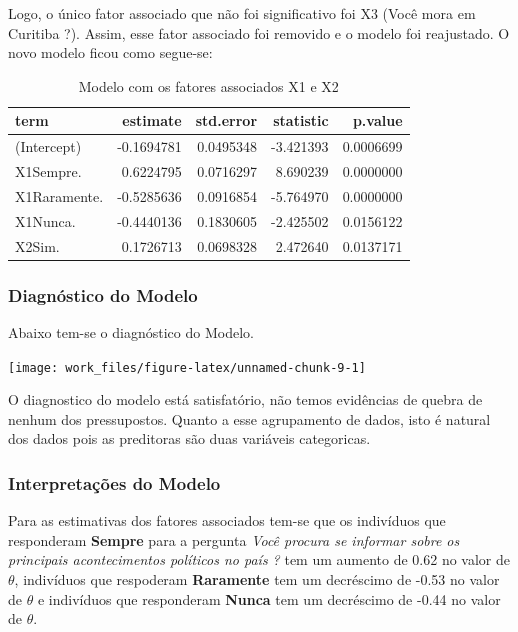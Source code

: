 \documentclass[]{article}
\begin{document}
Logo, o único fator associado que não foi significativo foi X3 (Você
mora em Curitiba ?). Assim, esse fator associado foi removido e o modelo
foi reajustado. O novo modelo ficou como segue-se:

\begin{table}[!h]

\caption{\label{tab:unnamed-chunk-8}Modelo com os fatores associados X1 e X2}
\centering
\begin{tabular}[t]{lrrrr}
\toprule
term & estimate & std.error & statistic & p.value\\
\midrule
(Intercept) & -0.1694781 & 0.0495348 & -3.421393 & 0.0006699\\
X1Sempre. & 0.6224795 & 0.0716297 & 8.690239 & 0.0000000\\
X1Raramente. & -0.5285636 & 0.0916854 & -5.764970 & 0.0000000\\
X1Nunca. & -0.4440136 & 0.1830605 & -2.425502 & 0.0156122\\
X2Sim. & 0.1726713 & 0.0698328 & 2.472640 & 0.0137171\\
\bottomrule
\end{tabular}
\end{table}

\subsubsection{Diagnóstico do Modelo}\label{diagnostico-do-modelo}

Abaixo tem-se o diagnóstico do Modelo.

\begin{center}\texttt{[image: work\_files/figure-latex/unnamed-chunk-9-1]} \end{center}

O diagnostico do modelo está satisfatório, não temos evidências de
quebra de nenhum dos pressupostos. Quanto a esse agrupamento de dados,
isto é natural dos dados pois as preditoras são duas variáveis
categoricas.

\subsubsection{Interpretações do Modelo}\label{interpretacoes-do-modelo}

Para as estimativas dos fatores associados tem-se que os indivíduos que
responderam \textbf{Sempre} para a pergunta \emph{Você procura se
informar sobre os principais acontecimentos políticos no país ?} tem um
aumento de 0.62 no valor de \(\theta\), indivíduos que respoderam
\textbf{Raramente} tem um decréscimo de -0.53 no valor de \(\theta\) e
indivíduos que responderam \textbf{Nunca} tem um decréscimo de -0.44 no
valor de \(\theta\).
\end{document}

